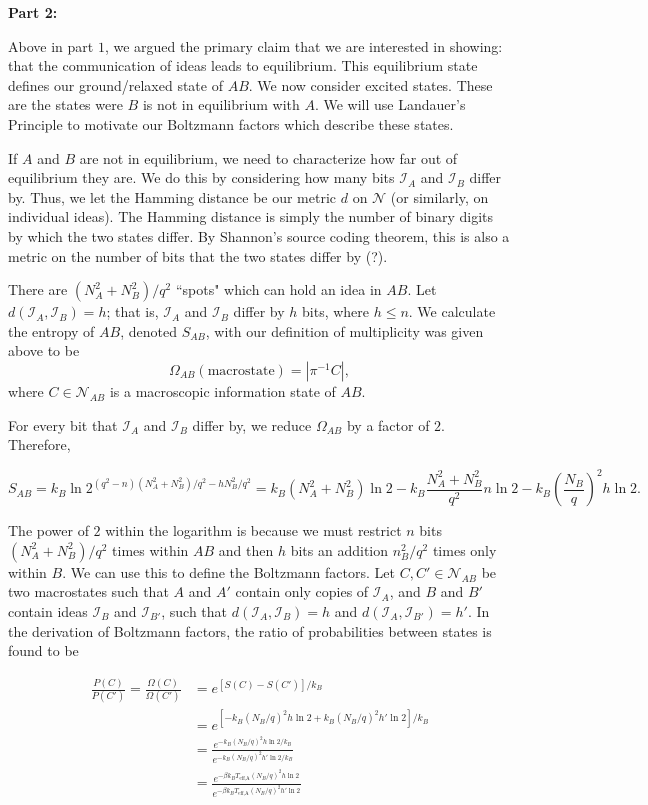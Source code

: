 \documentclass{article}
\begin{document}
\textbf{Part 2:}

Above in part $1$, we argued the primary claim that we are interested in showing: that the communication of ideas leads to equilibrium. This equilibrium state defines our ground/relaxed state of $AB$. We now consider excited states. These are the states were $B$ is not in equilibrium with $A$. We will use Landauer's Principle to motivate our Boltzmann factors which describe these states.

If $A$ and $B$ are not in equilibrium, we need to characterize how far out of equilibrium they are. We do this by considering how many bits $\mathcal{I}_A$ and $\mathcal{I}_B$ differ by. Thus, we let the Hamming distance be our metric $d$ on $\mathcal{N}$ (or similarly, on individual ideas). The Hamming distance is simply the number of binary digits by which the two states differ. By Shannon's source coding theorem, this is also a metric on the number of bits that the two states differ by (?).

There are $(N_A^2 + N_B^2)/q^2$ ``spots" which can hold an idea in $AB$. Let $d(\mathcal{I}_A,\mathcal{I}_B) = h$; that is, $\mathcal{I}_A$ and $\mathcal{I}_B$ differ by $h$ bits, where $h\leq n$. We calculate the entropy of $AB$, denoted $S_{AB}$, with our definition of multiplicity was given above to be
\[ \Omega_{AB}(\text{macrostate}) = |\pi^{-1}C|, \]
where $C\in\mathcal{N}_{AB}$ is a macroscopic information state of $AB$.

For every bit that $\mathcal{I}_A$ and $\mathcal{I}_B$ differ by, we reduce $\Omega_{AB}$ by a factor of $2$. Therefore,

\[ S_{AB} = k_B\ln{2^{(q^2 - n)(N_A^2+N_B^2)/q^2 - hN_B^2/q^2}} = k_B(N_A^2+N_B^2)\ln{2} - k_B\frac{N_A^2+N_B^2}{q^2}n\ln{2} - k_B\left(\frac{N_B}{q}\right)^2h\ln{2}. \]

The power of $2$ within the logarithm is because we must restrict $n$ bits $(N_A^2 + N_B^2)/q^2$ times within $AB$ and then $h$ bits an addition $n_B^2/q^2$ times only within $B$. We can use this to define the Boltzmann factors. Let $C,C'\in\mathcal{N}_{AB}$ be two macrostates such that $A$ and $A'$ contain only copies of $\mathcal{I}_A$, and $B$ and $B'$ contain ideas $\mathcal{I}_B$ and $\mathcal{I}_{B'}$, such that $d(\mathcal{I}_A,\mathcal{I}_{B}) = h$ and $d(\mathcal{I}_A,\mathcal{I}_{B'}) = h'$. In the derivation of Boltzmann factors, the ratio of probabilities between states is found to be

\[ 
\begin{split}
    \frac{P(C)}{P(C')} = \frac{\Omega(C)}{\Omega(C')} & = e^{[S(C) - S(C')]/k_B} \\
    & = e^{[-k_B(N_B/q)^2h\ln{2} + k_B(N_B/q)^2h'\ln{2}]/k_B} \\
    & = \frac{e^{-k_B(N_B/q)^2h\ln{2}/k_B}}{e^{-k_B(N_B/q)^2h'\ln{2}/k_B}} \\
    & = \frac{e^{-\beta k_BT_\text{eff,A}(N_B/q)^2h\ln{2}}}{e^{-\beta k_BT_\text{eff,A}(N_B/q)^2h'\ln{2}}}
\end{split}
\]
\end{document}
